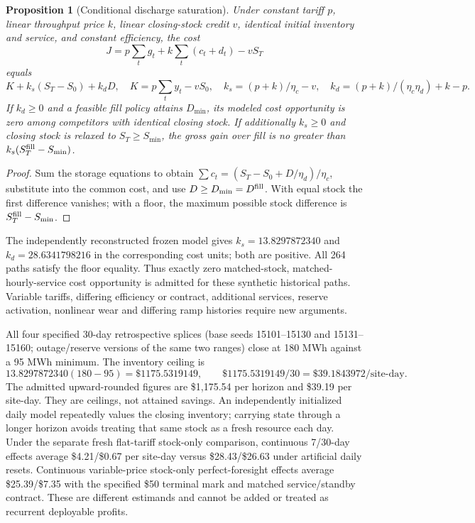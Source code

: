 \documentclass[11pt,letterpaper]{article}
\newtheorem{coaprop}[coathm]{Proposition}
\begin{document}
\begin{coaprop}[Conditional discharge saturation]
Under constant tariff $p$, linear throughput price $k$, linear closing-stock credit $v$, identical initial inventory and service, and constant efficiency, the cost
\[
 J=p\sum_tg_t+k\sum_t(c_t+d_t)-vS_T
\]
equals
\[
 K+k_s(S_T-S_0)+k_dD,\quad
 K=p\sum_t y_t-v S_0,\quad
 k_s=(p+k)/\eta_c-v,\quad
 k_d=(p+k)/(\eta_c\eta_d)+k-p .
\]
If $k_d\ge0$ and a feasible fill policy attains $D_{\min}$, its modeled cost opportunity is zero among competitors with identical closing stock. If additionally $k_s\ge0$ and closing stock is relaxed to $S_T\ge S_{\min}$, the gross gain over fill is no greater than $k_s(S_T^{\rm fill}-S_{\min})$.
\end{coaprop}
\begin{proof}Sum the storage equations to obtain $\sum c_t=(S_T-S_0+D/\eta_d)/\eta_c$, substitute into the common cost, and use $D\ge D_{\min}=D^{\rm fill}$. With equal stock the first difference vanishes; with a floor, the maximum possible stock difference is $S_T^{\rm fill}-S_{\min}$.\end{proof}
The independently reconstructed frozen model gives $k_s=13.8297872340$ and $k_d=28.6341798216$ in the corresponding cost units; both are positive. All 264 paths satisfy the floor equality. Thus exactly zero matched-stock, matched-hourly-service cost opportunity is admitted for these synthetic historical paths. Variable tariffs, differing efficiency or contract, additional services, reserve activation, nonlinear wear and differing ramp histories require new arguments.

All four specified 30-day retrospective splices (base seeds 15101--15130 and 15131--15160; outage/reserve versions of the same two ranges) close at 180 MWh against a 95 MWh minimum. The inventory ceiling is
\[
 13.8297872340(180-95)=\$1175.5319149,\qquad
 \$1175.5319149/30=\$39.1843972/\text{site-day}.
\]
The admitted upward-rounded figures are \$1,175.54 per horizon and \$39.19 per site-day. They are ceilings, not attained savings. An independently initialized daily model repeatedly values the closing inventory; carrying state through a longer horizon avoids treating that same stock as a fresh resource each day. Under the separate fresh flat-tariff stock-only comparison, continuous 7/30-day effects average \$4.21/\$0.67 per site-day versus \$28.43/\$26.63 under artificial daily resets. Continuous variable-price stock-only perfect-foresight effects average \$25.39/\$7.35 with the specified \$50 terminal mark and matched service/standby contract. These are different estimands and cannot be added or treated as recurrent deployable profits.
\end{document}
